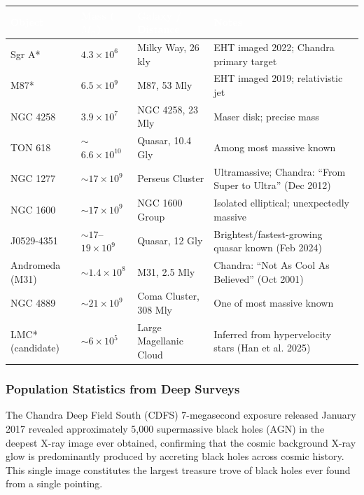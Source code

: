 \documentclass[11pt,letterpaper]{article}
\newcommand{\tableheader}[1]{\textbf{\sffamily\textcolor{white}{#1}}}
\begin{document}
\begin{center}
\begin{tabularx}{\textwidth}{L{2.8cm}C{2.2cm}L{2.5cm}X}
\toprule
{}
\tableheader{Object} & \tableheader{Mass ($M_\odot$)} & \tableheader{Galaxy / Distance} & \tableheader{Notes} \\
\midrule
Sgr A* & $4.3 \times 10^6$ & Milky Way, 26 kly & EHT imaged 2022; Chandra primary target \\
M87* & $6.5 \times 10^9$ & M87, 53 Mly & EHT imaged 2019; relativistic jet \\
NGC 4258 & $3.9 \times 10^7$ & NGC 4258, 23 Mly & Maser disk; precise mass \\
TON 618 & $\sim$$6.6 \times 10^{10}$ & Quasar, 10.4 Gly & Among most massive known \\
NGC 1277 & $\sim$$17 \times 10^9$ & Perseus Cluster & Ultramassive; Chandra: ``From Super to Ultra'' (Dec 2012) \\
NGC 1600 & $\sim$$17 \times 10^9$ & NGC 1600 Group & Isolated elliptical; unexpectedly massive \\
J0529-4351 & $\sim$$17$--$19 \times 10^9$ & Quasar, 12 Gly & Brightest/fastest-growing quasar known (Feb 2024) \\
Andromeda (M31) & $\sim$$1.4 \times 10^8$ & M31, 2.5 Mly & Chandra: ``Not As Cool As Believed'' (Oct 2001) \\
NGC 4889 & $\sim$$21 \times 10^9$ & Coma Cluster, 308 Mly & One of most massive known \\
LMC* (candidate) & $\sim$$6 \times 10^5$ & Large Magellanic Cloud & Inferred from hypervelocity stars (Han et al. 2025) \\
\bottomrule
\end{tabularx}
\end{center}

\subsubsection{Population Statistics from Deep Surveys}

The Chandra Deep Field South (CDFS) 7-megasecond exposure released January 2017 revealed approximately 5,000 supermassive black holes (AGN) in the deepest X-ray image ever obtained, confirming that the cosmic background X-ray glow is predominantly produced by accreting black holes across cosmic history. This single image constitutes the largest treasure trove of black holes ever found from a single pointing.
\end{document}
